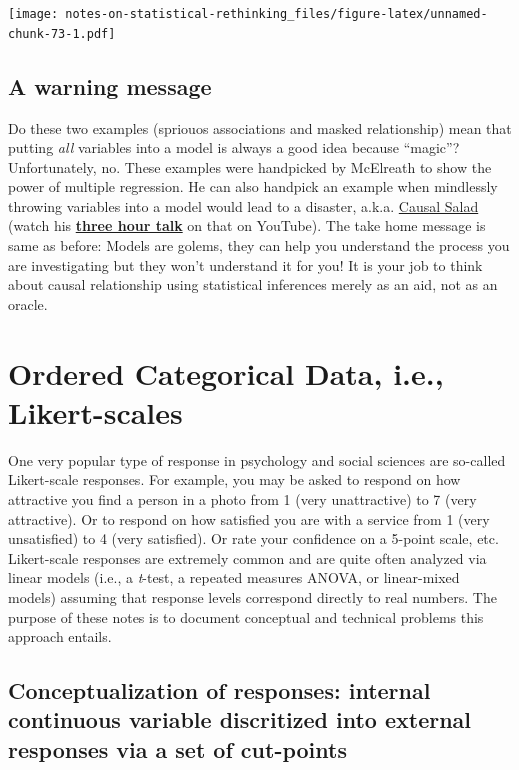 \documentclass[
]{book}
\begin{document}
\texttt{[image: notes-on-statistical-rethinking\_files/figure-latex/unnamed-chunk-73-1.pdf]}

\hypertarget{a-warning-message}{%
\section{A warning message}\label{a-warning-message}}

Do these two examples (spriouos associations and masked relationship) mean that putting \emph{all} variables into a model is always a good idea because ``magic''? Unfortunately, no. These examples were handpicked by McElreath to show the power of multiple regression. He can also handpick an example when mindlessly throwing variables into a model would lead to a disaster, a.k.a. \href{https://elevanth.org/blog/2021/06/15/regression-fire-and-dangerous-things-1-3/}{Causal Salad} (watch his \href{https://youtu.be/KNPYUVmY3NM}{\textbf{three hour talk}} on that on YouTube). The take home message is same as before: Models are golems, they can help you understand the process you are investigating but they won't understand it for you! It is your job to think about causal relationship using statistical inferences merely as an aid, not as an oracle.

\hypertarget{ordered-categorical-data-i.e.-likert-scales}{%
\chapter{Ordered Categorical Data, i.e., Likert-scales}\label{ordered-categorical-data-i.e.-likert-scales}}

One very popular type of response in psychology and social sciences are so-called Likert-scale responses. For example, you may be asked to respond on how attractive you find a person in a photo from 1 (very unattractive) to 7 (very attractive). Or to respond on how satisfied you are with a service from 1 (very unsatisfied) to 4 (very satisfied). Or rate your confidence on a 5-point scale, etc. Likert-scale responses are extremely common and are quite often analyzed via linear models (i.e., a \emph{t}-test, a repeated measures ANOVA, or linear-mixed models) assuming that response levels correspond directly to real numbers. The purpose of these notes is to document conceptual and technical problems this approach entails.

\hypertarget{conceptualization-of-responses-internal-continuous-variable-discritized-into-external-responses-via-a-set-of-cut-points}{%
\section{Conceptualization of responses: internal continuous variable discritized into external responses via a set of cut-points}\label{conceptualization-of-responses-internal-continuous-variable-discritized-into-external-responses-via-a-set-of-cut-points}}
\end{document}
